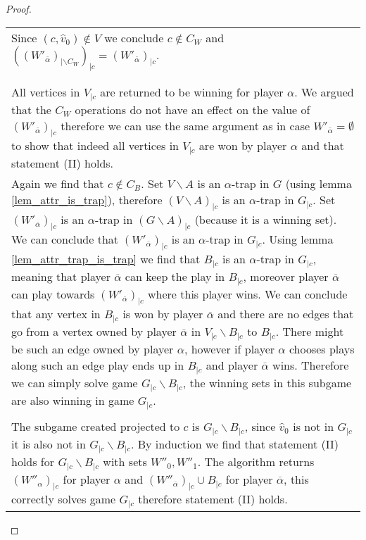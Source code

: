 \begin{theorem}
\begin{proof}
\begin{longtable}{|p{15.2cm}}
\begin{tabular}{|p{15cm}}
			\begin{tabular}{|p{14.8cm}}
				Case $W'_{\overline{\alpha}} \neq \emptyset$\\
				\hline
				Since $(c,\hat{v}_0) \notin V$ we conclude $c \notin C_W$ and $((W'_{\overline{\alpha}})_{|\backslash C_W})_{|c} = (W'_{\overline{\alpha}})_{|c}$.\\\\
				\begin{tabular}{|p{14.6cm}}
					Case $(W'_{\overline{\alpha}})_{|\backslash C} = \emptyset$\\
					\hline
					All vertices in $V_{|c}$ are returned to be winning for player $\alpha$. We argued that the $C_W$ operations do not have an effect on the value of $(W'_{\overline{\alpha}})_{|c}$ therefore we can use the same argument as in case $W'_{\overline{\alpha}} = \emptyset$ to show that indeed all vertices in $V_{|c}$ are won by player $\alpha$ and that statement (II) holds.
				\end{tabular}
				\begin{tabular}{|p{14.6cm}}
					Case $(W'_{\overline{\alpha}})_{|\backslash C} \neq \emptyset$\\
					\hline
					Again we find that $c \notin C_B$. Set $V \backslash A$ is an $\alpha$-trap in $G$ (using lemma \ref{lem_attr_is_trap}), therefore $(V \backslash A)_{|c}$ is an $\alpha$-trap in $G_{|c}$. Set $(W'_{\overline{\alpha}})_{|c}$ is an $\alpha$-trap in $(G\backslash A)_{|c}$ (because it is a winning set). We can conclude that $(W'_{\overline{\alpha}})_{|c}$ is an $\alpha$-trap in $G_{|c}$. Using lemma \ref{lem_attr_trap_is_trap} we find that $B_{|c}$ is an $\alpha$-trap in $G_{|c}$, meaning that player $\overline{\alpha}$ can keep the play in $B_{|c}$, moreover player $\overline{\alpha}$ can play towards $(W'_{\overline{\alpha}})_{|c}$ where this player wins. We can conclude that any vertex in $B_{|c}$ is won by player $\overline{\alpha}$ and there are no edges that go from a vertex owned by player $\overline{\alpha}$ in $V_{|c} \backslash B_{|c}$ to $B_{|c}$. There might be such an edge owned by player $\alpha$, however if player $\alpha$ chooses plays along such an edge play ends up in $B_{|c}$ and player $\overline{\alpha}$ wins. Therefore we can simply solve game $G_{|c} \backslash B_{|c}$, the winning sets in this subgame are also winning in game $G_{|c}$.\\\\			
					The subgame created projected to $c$ is $G_{|c} \backslash B_{|c}$, since $\hat{v}_0$ is not in $G_{|c}$ it is also not in $G_{|c} \backslash B_{|c}$. By induction we find that statement (II) holds for $G_{|c} \backslash B_{|c}$ with sets $W''_0,W''_1$. The algorithm returns $(W''_\alpha)_{|c}$ for player $\alpha$ and $(W''_{\overline{\alpha}})_{|c} \cup B_{|c}$ for player $\overline{\alpha}$, this correctly solves game $G_{|c}$ therefore statement (II) holds.

\end{tabular}
\end{tabular}
\end{tabular}
\end{longtable}
\end{proof}
\end{theorem}
